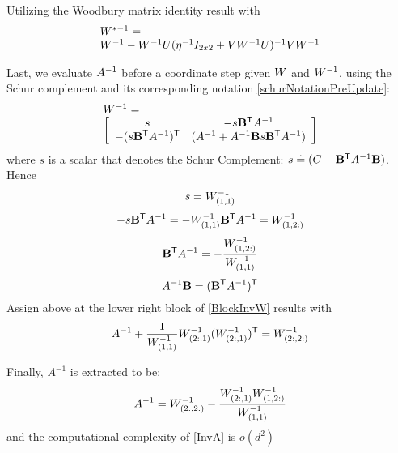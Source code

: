 \documentclass{article}
\begin{document}
Utilizing the Woodbury matrix identity result with
\begin{equation}
\begin{array}{lcl}
{W}^{*-1} = \\
{W}^{-1} - {W}^{-1} {U} (\eta^{-1} I_{2x2} + {V} {W}^{-1} {U})^{-1} {V} {W}^{-1}
\end{array}
\label{InvWwdb}
\end{equation}


Last, we evaluate ${A}^{-1}$ before a coordinate step given ${W}$
and ${W}^{-1}$, using the Schur complement and its corresponding
notation \eqref{schurNotationPreUpdate}:
\begin{equation}
  \begin{array}{l}
    {W}^{-1} =  \\
    \left[ \begin{array}{cc} s & -s \mathbf{B}{}^\mathsf{T} {A}^{-1} \\ -(s \mathbf{B}{}^\mathsf{T} {A}^{-1} ){}^\mathsf{T} & ({A}^{-1} + {A}^{-1} \mathbf{B} s \mathbf{B}{}^\mathsf{T} {A}^{-1} ) \end{array}  \right]
  \end{array}
  \label{BlockInvW}
\end{equation}
where $s$ is a scalar that denotes the Schur Complement:  $s \doteq ({C}-\mathbf{B}{}^\mathsf{T} {A}^{-1} \mathbf{B})$. Hence
\begin{equation}
  s = {W}^{-1}_{(1,1)}
  \label{invWkk}
\end{equation}
\begin{equation}
  -s \mathbf{B}{}^\mathsf{T} {A}^{-1} = -{W}^{-1}_{(1,1)} \mathbf{B}{}^\mathsf{T} {A}^{-1} = {W}^{-1}_{(1,2:)}
\end{equation}
\begin{equation}
  \mathbf{B}{}^\mathsf{T} {A}^{-1} = -\frac{{W}^{-1}_{(1,2:)}}{{W}^{-1}_{(1,1)} }
\end{equation}
\begin{equation}
  {A}^{-1}\mathbf{B} = (\mathbf{B}{}^\mathsf{T} {A}^{-1}){}^\mathsf{T}
  \label{invA_Btrans}
\end{equation}
Assign above at the lower right block of \eqref{BlockInvW} results with
\begin{equation}
  {A}^{-1} + \frac{1}{{W}^{-1}_{(1,1)} } {W}^{-1}_{(2:,1)} ({W}^{-1}_{(2:,1)}){}^\mathsf{T} = {W}^{-1}_{(2:,2:)}
\end{equation}

Finally, $A^{-1}$ is extracted to be:
\begin{equation}
{A}^{-1} = {W}^{-1}_{(2:,2:)}- \frac{{W}^{-1}_{(2:,1)} {W}^{-1}_{(1,2:)}}{{W}^{-1}_{(1,1)}}
\label{InvA}
\end{equation}
and the computational complexity of \eqref{InvA} is $o(d^2)$
\end{document}
